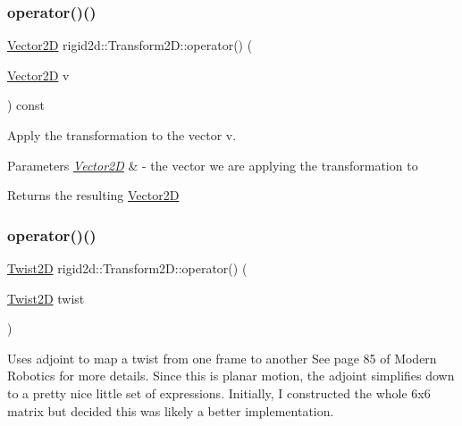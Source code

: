 \subsubsection{\texorpdfstring{operator()()}{operator()()}\hspace{0.1cm}{\footnotesize\ttfamily [1/2]}}
{\footnotesize\ttfamily \hyperlink{structrigid2d_1_1Vector2D}{Vector2D} rigid2d\+::\+Transform2\+D\+::operator() (\begin{DoxyParamCaption}\item[{\hyperlink{structrigid2d_1_1Vector2D}{Vector2D}}]{v }\end{DoxyParamCaption}) const}



Apply the transformation to the vector v. 


\begin{DoxyParams}{Parameters}
{\em \hyperlink{structrigid2d_1_1Vector2D}{Vector2D}} & -\/ the vector we are applying the transformation to \\
\hline
\end{DoxyParams}
\begin{DoxyReturn}{Returns}
the resulting \hyperlink{structrigid2d_1_1Vector2D}{Vector2D} 
\end{DoxyReturn}
\mbox{\label{classrigid2d_1_1Transform2D_a64346bd397406cf26e12d3022a3c3dee}} 
\subsubsection{\texorpdfstring{operator()()}{operator()()}\hspace{0.1cm}{\footnotesize\ttfamily [2/2]}}
{\footnotesize\ttfamily \hyperlink{classrigid2d_1_1Twist2D}{Twist2D} rigid2d\+::\+Transform2\+D\+::operator() (\begin{DoxyParamCaption}\item[{\hyperlink{classrigid2d_1_1Twist2D}{Twist2D}}]{twist }\end{DoxyParamCaption})}



Uses adjoint to map a twist from one frame to another See page 85 of Modern Robotics for more details. Since this is planar motion, the adjoint simplifies down to a pretty nice little set of expressions. Initially, I constructed the whole 6x6 matrix but decided this was likely a better implementation. 



